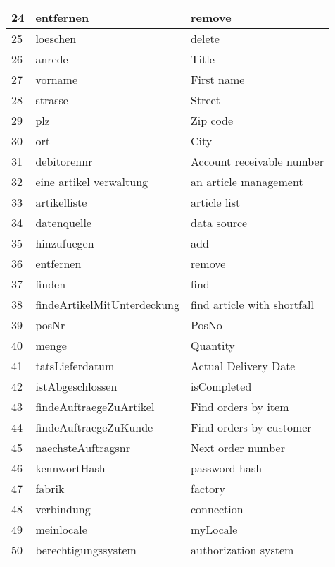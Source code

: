 \begin{center}
\begin{longtable}{|p{1cm}|p{5cm}|p{5cm}|}
24 & entfernen & remove\\ \hline
25 & loeschen & delete\\ \hline
26 & anrede & Title\\ \hline
27 & vorname & First name\\ \hline
28 & strasse & Street\\ \hline
29 & plz & Zip code\\ \hline
30 & ort & City\\ \hline
31 & debitorennr & Account receivable number\\ \hline
32 & eine artikel verwaltung & an article management\\ \hline
33 & artikelliste & article list\\ \hline
34 & datenquelle & data source\\ \hline
35 & hinzufuegen & add\\ \hline
36 & entfernen & remove\\ \hline
37 & finden & find\\ \hline
38 & findeArtikelMitUnterdeckung & find article with shortfall\\ \hline
39 & posNr & PosNo\\ \hline
40 & menge & Quantity\\ \hline
41 & tatsLieferdatum & Actual Delivery Date\\ \hline
42 & istAbgeschlossen & isCompleted\\ \hline
43 & findeAuftraegeZuArtikel & Find orders by item\\ \hline
44 & findeAuftraegeZuKunde & Find orders by customer\\ \hline
45 & naechsteAuftragsnr & Next order number\\ \hline
46 & kennwortHash & password hash\\ \hline
47 & fabrik & factory\\ \hline
48 & verbindung & connection\\ \hline
49 & meinlocale & myLocale\\ \hline
50 & berechtigungssystem & authorization system\\ \hline
\end{longtable}
\end{center}